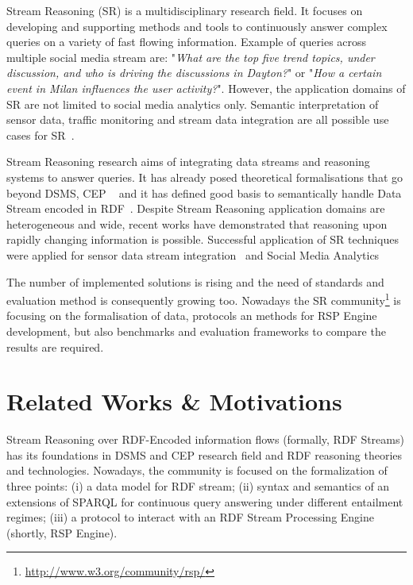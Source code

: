 Stream Reasoning (SR) is a multidisciplinary research field. It focuses on developing and supporting methods and tools to continuously answer complex queries on a variety of fast flowing information. Example of queries across multiple social media stream are: "\textit{What are the top five trend topics, under discussion, and who is driving the discussions in Dayton?}" or "\textit{How a certain event in Milan influences the user activity?}". However, the application domains of SR are not limited to social media analytics only. Semantic interpretation of sensor data, traffic monitoring and stream data integration are all possible use cases for SR~\cite{DBLP:journals/expert/ValleCHF09}.

Stream Reasoning research aims of integrating data streams and reasoning systems to answer queries. It has already posed theoretical formalisations that go beyond DSMS, CEP ~\cite{DBLP:conf/debs/KomazecCF12, Lephuoc2011, 4618773} and it has defined good basis to semantically handle Data Stream encoded in RDF~\cite{DBLP:conf/fis/ValleCBBC08, DBLP:journals/sigmod/BarbieriBCVG10}. Despite Stream Reasoning application domains are heterogeneous and wide, recent works have demonstrated that reasoning upon rapidly changing information is possible. Successful application of SR techniques were applied for sensor data stream integration~\cite{DBLP:journals/ijswis/CalbimonteJCA12,DBLP:journals/ws/LecueTHTBST14} and Social Media Analytics~\cite{DBLP:journals/ws/BalduiniCDVHLKT12}

The number of implemented solutions is rising and the need of standards and evaluation method is consequently growing too. Nowadays the SR community\footnote{\url{http://www.w3.org/community/rsp/}} is focusing on the formalisation of data, protocols an methods for RSP Engine development, but also benchmarks and evaluation frameworks to compare the results are required.


\section{Related Works \& Motivations}\label{sec:motivations-intro}

Stream Reasoning over RDF-Encoded information flows (formally, RDF Streams) has its foundations in DSMS and CEP research field and RDF reasoning theories and technologies. Nowadays, the community is focused on the formalization of three points:  (i) a data model for RDF stream; (ii) syntax and semantics of an extensions of SPARQL for continuous query answering under different entailment regimes; (iii) a protocol to interact with an RDF Stream Processing Engine (shortly, RSP Engine). 

